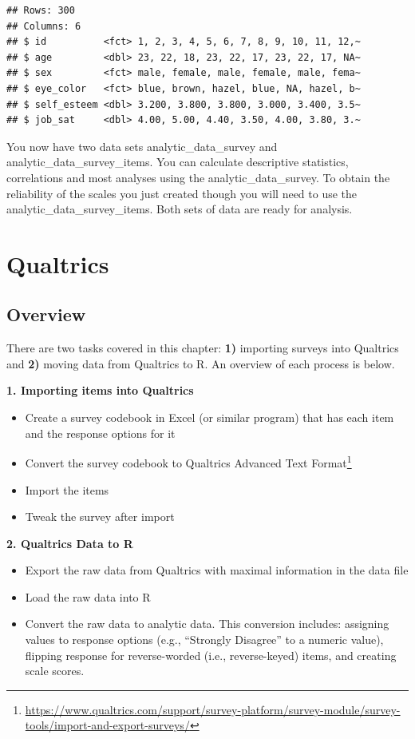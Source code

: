 \documentclass[
]{krantz}
\providecommand{\tightlist}{%
  \setlength{\itemsep}{0pt}\setlength{\parskip}{0pt}}
\renewcommand{\href}[2]{#2\footnote{\url{#1}}}
\begin{document}
\begin{verbatim}
## Rows: 300
## Columns: 6
## $ id          <fct> 1, 2, 3, 4, 5, 6, 7, 8, 9, 10, 11, 12,~
## $ age         <dbl> 23, 22, 18, 23, 22, 17, 23, 22, 17, NA~
## $ sex         <fct> male, female, male, female, male, fema~
## $ eye_color   <fct> blue, brown, hazel, blue, NA, hazel, b~
## $ self_esteem <dbl> 3.200, 3.800, 3.800, 3.000, 3.400, 3.5~
## $ job_sat     <dbl> 4.00, 5.00, 4.40, 3.50, 4.00, 3.80, 3.~
\end{verbatim}

You now have two data sets analytic\_data\_survey and analytic\_data\_survey\_items. You can calculate descriptive statistics, correlations and most analyses using the analytic\_data\_survey. To obtain the reliability of the scales you just created though you will need to use the analytic\_data\_survey\_items. Both sets of data are ready for analysis.

\hypertarget{qualtrics}{%
\chapter{Qualtrics}\label{qualtrics}}

\hypertarget{overview-3}{%
\section{Overview}\label{overview-3}}

There are two tasks covered in this chapter: \textbf{1)} importing surveys into Qualtrics and \textbf{2)} moving data from Qualtrics to R. An overview of each process is below.

\textbf{1. Importing items into Qualtrics}

\begin{itemize}
\tightlist
\item
  Create a survey codebook in Excel (or similar program) that has each item and the response options for it
\item
  Convert the survey codebook to Qualtrics \href{https://www.qualtrics.com/support/survey-platform/survey-module/survey-tools/import-and-export-surveys/}{Advanced Text Format}
\item
  Import the items
\item
  Tweak the survey after import
\end{itemize}

\textbf{2. Qualtrics Data to R}

\begin{itemize}
\tightlist
\item
  Export the raw data from Qualtrics with maximal information in the data file
\item
  Load the raw data into R
\item
  Convert the raw data to analytic data. This conversion includes: assigning values to response options (e.g., ``Strongly Disagree'' to a numeric value), flipping response for reverse-worded (i.e., reverse-keyed) items, and creating scale scores.
\end{itemize}
\end{document}
